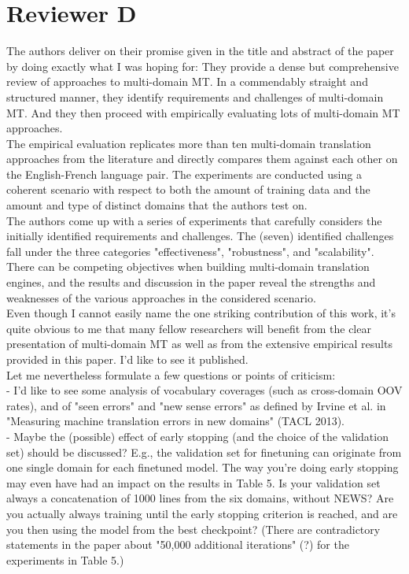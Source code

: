 \documentclass[12pt,times,a4paper,twoside]{article}
\theoremstyle{definition}
\begin{document}
\section*{Reviewer D}
The authors deliver on their promise given in the title and abstract of the paper by doing exactly what I was hoping for: They provide a dense but comprehensive review of approaches to multi-domain MT. In a commendably straight and structured manner, they identify requirements and challenges of multi-domain MT. And they then proceed with empirically evaluating lots of multi-domain MT approaches.
\\
The empirical evaluation replicates more than ten multi-domain translation approaches from the literature and directly compares them against each other on the English-French language pair. The experiments are conducted using a coherent scenario with respect to both the amount of training data and the amount and type of distinct domains that the authors test on.
\\
The authors come up with a series of experiments that carefully considers the initially identified requirements and challenges. The (seven) identified challenges fall under the three categories "effectiveness", "robustness", and "scalability". There can be competing objectives when building multi-domain translation engines, and the results and discussion in the paper reveal the strengths and weaknesses of the various approaches in the considered scenario.
\\
Even though I cannot easily name the one striking contribution of this work, it's quite obvious to me that many fellow researchers will benefit from the clear presentation of multi-domain MT as well as from the extensive empirical results provided in this paper. I'd like to see it published.
\\
Let me nevertheless formulate a few questions or points of criticism:
\\
- I'd like to see some analysis of vocabulary coverages (such as
cross-domain OOV rates), and of "seen errors" and "new sense errors" as defined by Irvine et al. in "Measuring machine translation errors in new domains" (TACL 2013).
\\
- Maybe the (possible) effect of early stopping (and the choice of the validation set) should be discussed? E.g., the validation set for
finetuning can originate from one single domain for each finetuned model. The way you're doing early stopping may even have had an impact on the results in Table 5. Is your validation set always a concatenation of 1000 lines from the six domains, without NEWS? Are you actually always training until the early stopping criterion is reached, and are you then using the model from the best checkpoint? (There are contradictory statements in the paper about "50,000  additional iterations" (?) for the experiments in Table 5.)
\end{document}
